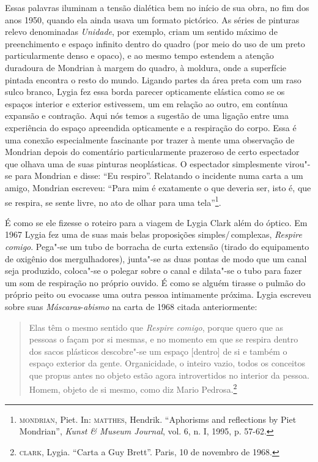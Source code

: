 \begin{multicols}{2}
Essas palavras iluminam a tensão dialética bem no início de sua obra, no
fim dos anos 1950, quando ela ainda usava um formato pictórico. As
séries de pinturas relevo denominadas \textit{Unidade}, por exemplo, criam
um sentido máximo de preenchimento e espaço infinito dentro do quadro
(por meio do uso de um preto particularmente denso e opaco), e ao mesmo
tempo estendem a atenção duradoura de Mondrian à margem do quadro, à
moldura, onde a superfície pintada encontra o resto do mundo. Ligando
partes da área preta com um raso sulco branco, Lygia fez essa borda
parecer opticamente elástica como se os espaços interior e exterior
estivessem, um em relação ao outro, em contínua expansão e contração.
Aqui nós temos a sugestão de uma ligação entre uma experiência do espaço
apreendida opticamente e a respiração do corpo. Essa é uma conexão
especialmente fascinante por trazer à mente uma observação de Mondrian
depois do comentário particularmente prazeroso de certo espectador que
olhava uma de suas pinturas neoplásticas. O espectador simplesmente
virou"-se para Mondrian e disse: ``Eu respiro''. Relatando o incidente numa
carta a um amigo, Mondrian escreveu: ``Para mim é exatamente o que
deveria ser, isto é, que se respira, se sente livre, no ato de olhar
para uma tela''\footnote{\textsc{mondrian}, Piet. In: \textsc{matthes}, Hendrik. ``Aphorisms
  and reflections by Piet Mondrian'', \textit{Kunst \& Museum Journal},
  vol. 6, n. I, 1995, p. 57-62.}.

É como se ele fizesse o roteiro para a viagem de Lygia Clark além do
óptico. Em 1967 Lygia fez uma de suas mais belas proposições
simples/\,complexas, \textit{Respire comigo}. Pega"-se um tubo de borracha de
curta extensão (tirado do equipamento de oxigênio dos mergulhadores),
junta"-se as duas pontas de modo que um canal seja produzido, coloca"-se o
polegar sobre o canal e dilata"-se o tubo para fazer um som de respiração
no próprio ouvido. É como se alguém tirasse o pulmão do próprio peito ou
evocasse uma outra pessoa intimamente próxima. Lygia escreveu sobre suas
\textit{Máscaras}-\textit{abismo} na carta de 1968 citada anteriormente:

\begin{quote}
Elas têm o mesmo sentido que \textit{Respire comigo}, porque quero que as
pessoas o façam por si mesmas, e no momento em que se respira dentro dos
sacos plásticos descobre"-se um espaço {[}dentro{]} de si e também o
espaço exterior da gente. Organicidade, o inteiro vazio, todos os
conceitos que propus antes no objeto estão agora introvertidos no
interior da pessoa. Homem, objeto de si mesmo, como diz Mario
Pedrosa.\footnote{\textsc{clark}, Lygia. ``Carta a Guy Brett''. Paris, 10 de
  novembro de 1968.}
\end{quote}


\end{multicols}
